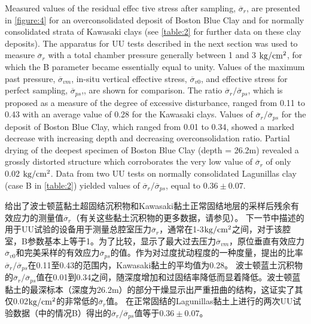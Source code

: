 

\begin{paracol}{2}
    
    Measured values of the residual effec tive stress after sampling, $\overline{\sigma}_r$, are presented in \autoref{figure:4} for an overconsolidated deposit of Boston Blue Clay and for normally consolidated strata of Kawasaki clays (see \autoref{table:2} for further data on these clay deposits). The apparatus for UU tests described in the next section was used to measure $\overline{\sigma}_r$ with a total chamber pressure generally between 1 and 3 $\rm{kg/cm^2}$, for which the B parameter became essentially equal to unity. Values of the maximum past pressure, $\overline{\sigma}_{vm}$, in-situ vertical effective stress, $\overline{\sigma}_{v0}$, and effective stress for perfect sampling, $\overline{\sigma}_{ps}$,, are shown for comparison. The ratio $\overline{\sigma}_r/\overline{\sigma}_{ps}$, which is proposed as a measure of the degree of excessive disturbance, ranged from 0.11 to 0.43 with an average value of 0.28 for the Kawasaki clays. Values of $\overline{\sigma}_r/\overline{\sigma}_{ps}$ for the deposit of Boston Blue Clay, which ranged from 0.01 to 0.34, showed a marked decrease with increasing depth and decreasing overconsolidation ratio. Partial drying of the deepest specimen of Boston Blue Clay (depth = 26.2m) revealed a grossly distorted structure which corroborates the very low value of $\overline{\sigma}_r$ of only 0.02 $\rm{kg/cm^2}$. Data from two UU tests on normally consolidated Lagunillas clay (case B in \autoref{table:2}) yielded values of $\overline{\sigma}_r/\overline{\sigma}_{ps}$, equal to $0.36\pm{}0.07$.

    \switchcolumn

    给出了波士顿蓝黏土超固结沉积物和Kawasaki黏土正常固结地层的采样后残余有效应力的测量值$\overline{\sigma}_r$（有关这些黏土沉积物的更多数据，请参见）。 下一节中描述的用于UU试验的设备用于测量总腔室压力$\overline{\sigma}_r$，通常在1-3$\rm{kg/cm^2}$之间，对于该腔室，B参数基本上等于1。为了比较，显示了最大过去压力$\overline{\sigma}_{vm}$，原位垂直有效应力$\overline{\sigma}_{v0}$和完美采样的有效应力$\overline{\sigma}_{ps}$的值。作为对过度扰动程度的一种度量，提出的比率$\overline{\sigma}_r/\overline{\sigma}_{ps}$在0.11至0.43的范围内，Kawasaki黏土的平均值为0.28。 波士顿蓝土沉积物的$\overline{\sigma}_r/\overline{\sigma}_{ps}$值在0.01到0.34之间，随深度增加和过固结率降低而显着降低。波士顿蓝黏土的最深标本（深度为26.2m）的部分干燥显示出严重扭曲的结构，这证实了其仅0.02$\rm{kg/cm^2}$的非常低的$\overline{\sigma}_r$值。 在正常固结的Lagunillas黏土上进行的两次UU试验数据（中的情况B）得出的$\overline{\sigma}_r/\overline{\sigma}_{ps}$值等于$0.36\pm{}0.07$。

\end{paracol}

